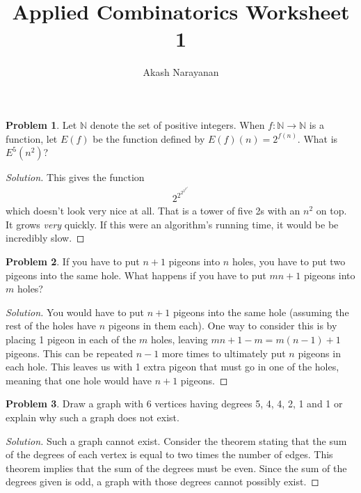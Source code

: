 \documentclass[12pt]{article}
\title{Applied Combinatorics Worksheet 1}
\author{Akash Narayanan}
\theoremstyle{definition}
\newtheorem{problem-internal}{Problem}[]
\newenvironment{problem}{
  \medskip
  \begin{problem-internal}
}{
\end{problem-internal}
}
\newenvironment{solution}{
  \begin{proof}[Solution]
    \vspace{-8px}
    \setlength{\parskip}{4px}
    \setlength{\parindent}{0px}
}{
\end{proof}
}
\begin{document}
  \maketitle

  \begin{problem}
    Let \(\mathbb{N}\) denote the set of positive integers. When \( f : \mathbb{N} \rightarrow \mathbb{N} \) is a function, let \(E(f)\) be the function defined by \(E(f)(n) = 2^{f(n)}\). What is \(E^{5}(n^{2})\)?
  \end{problem}

  \begin{solution}
    This gives the function
    \begin{align*}
      2^{2^{2^{2^{2^{n^{2}}}}}}
    \end{align*}
    which doesn't look very nice at all. That is a tower of five 2s with an \(n^2\) on top. It grows \textit{very} quickly. If this were an algorithm's running time, it would be be incredibly slow.
  \end{solution}

  \begin{problem}
    If you have to put \(n + 1\) pigeons into \(n\) holes, you have to put two pigeons into the same hole. What happens if you have to put \(mn + 1\) pigeons into \(m\) holes?
  \end{problem}

  \begin{solution}
    You would have to put \(n + 1\) pigeons into the same hole (assuming the rest of the holes have \(n\) pigeons in them each). One way to consider this is by placing 1 pigeon in each of the \(m\) holes, leaving \(mn + 1 - m = m(n-1) + 1\) pigeons. This can be repeated \(n-1\) more times to ultimately put \(n\) pigeons in each hole. This leaves us with 1 extra pigeon that must go in one of the holes, meaning that one hole would have \(n+1\) pigeons.
  \end{solution}

  \begin{problem}
    Draw a graph with 6 vertices having degrees 5, 4, 4, 2, 1 and 1 or explain why such a graph does not exist.
  \end{problem}

  \begin{solution}
    Such a graph cannot exist. Consider the theorem stating that the sum of the degrees of each vertex is equal to two times the number of edges. This theorem implies that the sum of the degrees must be even. Since the sum of the degrees given is odd, a graph with those degrees cannot possibly exist.
  \end{solution}
\end{document}
